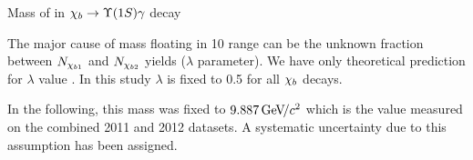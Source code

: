\begin{frame}{Mass of \chiboneOneP in $\chib \to \OneS \gamma$ decay}
\begin{center}
\end{center}
\begin{alertblock}{}
The major cause of  \chiboneOneP mass floating in 10 \mevcc range can be the unknown fraction
between $N_{\chi_{b 1}}$ and $N_{\chi_{b 2}}$ yields ($\lambda$ parameter). 
We have only theoretical prediction for $\lambda$ value . In this study
$\lambda$ is fixed to 0.5 for all $\chi_{b}$ decays.
\end{alertblock}

In the following, this mass was fixed to $9.887{\mathrm{\,Ge\kern -0.1em V\!/}c^2}$  which is the value
measured on the combined 2011 and 2012 datasets. A systematic uncertainty due
to this assumption has been assigned.

\end{frame}